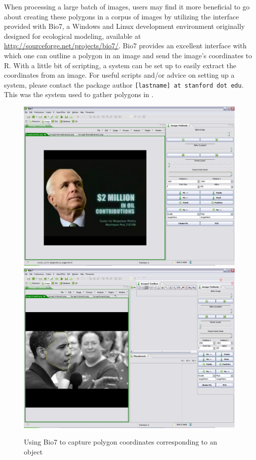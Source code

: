 \documentclass[12pt]{article}
\begin{document}
When processing a large batch of images, users may find it more beneficial to go about creating these polygons in a corpus of images by utilizing the interface provided with Bio7, a Windows and Linux development environment originally designed for ecological modeling, available at \url{http://sourceforge.net/projects/bio7/}.  Bio7 provides an excellent interface with which one can outline a polygon in an image and send the image's coordinates to R.  With a little bit of scripting, a system can be set up to easily extract the coordinates from an image.  For useful scripts and/or advice on setting up a system, please contact the package author \texttt{[lastname] at stanford dot edu}.  This was the system used to gather polygons in \citet{messing2009Bias}.      

\begin{figure}[ht]
\centering
\caption{Using Bio7 to capture polygon coordinates corresponding to an object}
\includegraphics{CodingMcCain.png}
\includegraphics{Instructions2.png}
\label{fig:jmfamily}
\end{figure}
\end{document}
